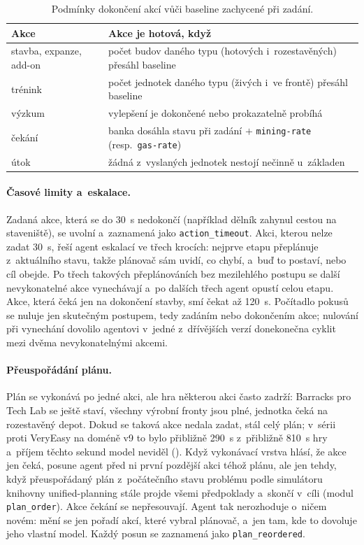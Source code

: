 \begin{table}[ht]
	\centering
	\caption{Podmínky dokončení akcí vůči baseline zachycené při zadání.}
	\label{tab:podminky}
	\begin{tabularx}{\textwidth}{@{} l >{\raggedright\arraybackslash}X @{}}
		\toprule
		\textbf{Akce} & \textbf{Akce je hotová, když} \\
		\midrule
		stavba, expanze, add-on & počet budov daného typu (hotových i~rozestavěných) přesáhl baseline \\
		trénink & počet jednotek daného typu (živých i~ve frontě) přesáhl baseline \\
		výzkum & vylepšení je dokončené nebo prokazatelně probíhá \\
		čekání & banka dosáhla stavu při zadání $+$ \texttt{mining-rate} (resp.\ \texttt{gas-rate}) \\
		útok & žádná z~vyslaných jednotek nestojí nečinně u~základen \\
		\bottomrule
	\end{tabularx}
\end{table}

\paragraph{Časové limity a~eskalace.} Zadaná akce, která se do 30~s nedokončí (například dělník zahynul cestou na staveniště), se uvolní a~zaznamená jako \texttt{action\_timeout}. Akci, kterou nelze zadat 30~s, řeší agent eskalací ve třech krocích: nejprve etapu přeplánuje z~aktuálního stavu, takže plánovač sám uvidí, co chybí, a~buď to postaví, nebo cíl obejde. Po třech takových přeplánováních bez mezilehlého postupu se další nevykonatelné akce vynechávají a~po dalších třech agent opustí celou etapu. Akce, která čeká jen na dokončení stavby, smí čekat až 120~s. Počítadlo pokusů se nuluje jen skutečným postupem, tedy zadáním nebo dokončením akce; nulování při vynechání dovolilo agentovi v~jedné z~dřívějších verzí donekonečna cyklit mezi dvěma nevykonatelnými akcemi.

\paragraph{Přeuspořádání plánu.} Plán se vykonává po jedné akci, ale hra některou akci často zadrží: Barracks pro Tech Lab se ještě staví, všechny výrobní fronty jsou plné, jednotka čeká na rozestavěný depot. Dokud se taková akce nedala zadat, stál celý plán; v~sérii proti VeryEasy na doméně v9 to bylo přibližně 290~s z~přibližně 810~s hry a~příjem těchto sekund model neviděl (). Když vykonávací vrstva hlásí, že akce jen čeká, posune agent před ni první pozdější akci téhož plánu, ale jen tehdy, když přeuspořádaný plán z~počátečního stavu problému podle simulátoru knihovny unified-planning stále projde všemi předpoklady a~skončí v~cíli (modul \texttt{plan\_order}). Akce čekání se nepřesouvají. Agent tak nerozhoduje o~ničem novém: mění se jen pořadí akcí, které vybral plánovač, a~jen tam, kde to dovoluje jeho vlastní model. Každý posun se zaznamená jako \texttt{plan\_reordered}.

